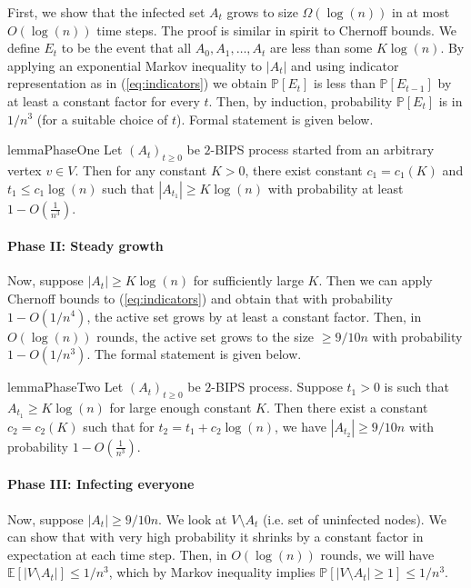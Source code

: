 \documentclass[11pt]{article}
\newcommand{\E}{\mathbb E}
\renewcommand{\Pr}{\mathbb P}
\theoremstyle{remark}
\begin{document}
First, we show that the infected set $A_t$ grows to size $\Omega(\log(n))$ in at most $O(\log(n))$ time steps. The proof is similar in spirit to Chernoff bounds. We define $E_t$ to be the event that all $A_0, A_1, \ldots, A_t$ are less than some $K\log(n)$. By applying an exponential Markov inequality to $|A_t|$ and using indicator representation as in (\ref{eq:indicators}) we obtain $\Pr[E_t]$ is less than $\Pr[E_{t-1}]$ by at least a constant factor for every $t$. Then, by induction, probability $\Pr[E_t]$ is in $1/n^3$ (for a suitable choice of $t$). Formal statement is given below. 

\begin{restatable}{lemma}{PhaseOne}
    \label{lemma:phase1}
    Let $(A_t)_{t\ge 0}$ be $2$-BIPS process started from an arbitrary vertex $v\in V$. Then for any constant $K > 0$, there exist constant $c_1 = c_1(K)$ and $t_1 \le c_1\log(n)$ such that $|A_{t_1}| \ge K\log(n)$ with probability at least $1 - O\left(\frac{1}{n^3}\right)$. 
\end{restatable}

\paragraph{Phase II: Steady growth}

Now, suppose $|A_t| \ge K\log(n)$ for sufficiently large $K$. Then we can apply Chernoff bounds to (\ref{eq:indicators}) and obtain that with probability $1 - O(1/n^4)$, the active set grows by at least a constant factor. Then, in $O(\log(n))$ rounds, the active set grows to the size $\ge 9/10 n$ with probability $1 - O(1/n^3)$. The formal statement is given below.

\begin{restatable}{lemma}{PhaseTwo}
    \label{lemma:phase2}
    Let $(A_t)_{t\ge 0}$ be $2$-BIPS process. Suppose $t_1 > 0$ is such that $A_{t_1} \ge K\log(n)$ for large enough constant $K$. Then there exist a constant $c_2 = c_2(K)$ such that for $t_2 = t_1 + c_2\log(n)$, we have $|A_{t_2}| \ge 9/10 n$ with probability $1 - O\left(\frac{1}{n^3}\right)$.
\end{restatable}

\paragraph{Phase III: Infecting everyone}
Now, suppose $|A_t| \ge 9/10 n$. We look at $V\setminus A_t$ (i.e. set of uninfected nodes). We can show that with very high probability it shrinks by a constant factor in expectation at each time step. Then, in $O(\log(n))$ rounds, we will have $\E[|V\setminus A_t|] \le 1/n^3$, which by Markov inequality implies $\Pr[|V\setminus A_t| \ge 1] \le 1/n^3$.
\end{document}
